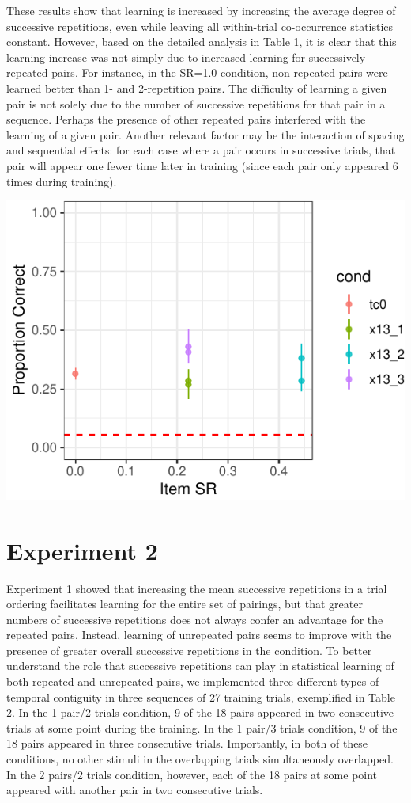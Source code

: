 \documentclass[man,floatsintext]{apa6}
\begin{document}
These results show that learning is increased by increasing the average degree of successive repetitions, even while leaving all within-trial co-occurrence statistics constant. However, based on the detailed analysis in Table 1, it is clear that this learning increase was not simply due to increased learning for successively repeated pairs. For instance, in the SR=1.0 condition, non-repeated pairs were learned better than 1- and 2-repetition pairs. The difficulty of learning a given pair is not solely due to the number of successive repetitions for that pair in a sequence. Perhaps the presence of other repeated pairs interfered with the learning of a given pair. Another relevant factor may be the interaction of spacing and sequential effects: for each case where a pair occurs in successive trials, that pair will appear one fewer time later in training (since each pair only appeared 6 times during training).

\includegraphics{figs/exp2-1.pdf}

\hypertarget{experiment-2}{%
\section{Experiment 2}\label{experiment-2}}

Experiment 1 showed that increasing the mean successive repetitions in a trial ordering facilitates learning for the entire set of pairings, but that greater numbers of successive repetitions does not always confer an advantage for the repeated pairs. Instead, learning of unrepeated pairs seems to improve with the presence of greater overall successive repetitions in the condition. To better understand the role that successive repetitions can play in statistical learning of both repeated and unrepeated pairs, we implemented three different types of temporal contiguity in three sequences of 27 training trials, exemplified in Table 2. In the 1 pair/2 trials condition, 9 of the 18 pairs appeared in two consecutive trials at some point during the training. In the 1 pair/3 trials condition, 9 of the 18 pairs appeared in three consecutive trials. Importantly, in both of these conditions, no other stimuli in the overlapping trials simultaneously overlapped. In the 2 pairs/2 trials condition, however, each of the 18 pairs at some point appeared with another pair in two consecutive trials.
\end{document}
